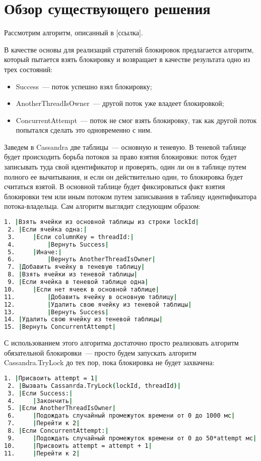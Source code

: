 \section{Обзор существующего решения}

Рассмотрим алгоритм, описанный в [ссылка].

В качестве основы для реализаций стратегий блокировок предлагается алгоритм, который пытается взять блокировку и возвращает в качестве результата одно из трех состояний:

\begin{itemize}
	\item Success~--- поток успешно взял блокировку;
	\item AnotherThreadIsOwner~--- другой поток уже владеет блокировкой;
	\item ConcurrentAttempt~--- поток не смог взять блокировку, так как другой поток попытался сделать это одновременно с ним.
\end{itemize}

Заведем в Cassandra две таблицы~--- основную и теневую. В теневой таблице будет происходить борьба потоков за право взятия блокировки: поток будет записывать туда свой идентификатор и проверять, один ли он в таблице путем полного ее вычитывания, и если он действительно один, то блокировка будет считаться взятой. В основной таблице будет фиксироваться факт взятия блокировки тем или иным потоком путем записывания в таблицу идентификатора потока-владельца.
Сам алгоритм выглядит следующим образом:


\begin{lstlisting}[language=csh,caption={Алгоритм Cassandra.TryLock(lockId, threadId)}]
 1. |Взять ячейки из основной таблицы из строки lockId|
 2. |Если ячейка одна:|
 3. 	|Если columnKey = threadId:|
 4. 		|Вернуть Success|
 5. 	|Иначе:|
 6. 		|Вернуть AnotherThreadIsOwner|
 7. |Добавить ячейку в теневую таблицу|
 8. |Взять ячейки из теневой таблицы|
 9. |Если ячейка в теневой таблице одна|
10. 	|Если нет ячеек в основной таблице|
11. 		|Добавить ячейку в основную таблицу|
12. 		|Удалить свою ячейку из теневой таблицы|
13. 		|Вернуть Success|
14. |Удалить свою ячейку из теневой таблицы|
15. |Вернуть ConcurrentAttempt|
\end{lstlisting}

С использованием этого алгоритма достаточно просто реализовать алгоритм обязательной блокировки~--- просто будем запускать алгоритм Cassandra.TryLock до тех пор, пока блокировка не будет захвачена:

\begin{lstlisting}[language=csh,caption={Алгоритм Cassandra.GetLock(lockId, threadId)}]
 1. |Присвоить attempt = 1|
 2. |Вызвать Cassanrda.TryLock(lockId, threadId)|
 3. |Если Success:|
 4. 	|Закончить|
 5. |Если AnotherThreadIsOwner|
 6. 	|Подождать случайный промежуток времени от 0 до 1000 мс|
 7. 	|Перейти к 2|
 8. |Если ConcurrentAttempt:|
 9. 	|Подождать случайный промежуток времени от 0 до 50*attempt мс|
10. 	|Присвоить attempt = attempt + 1|
11. 	|Перейти к 2|
\end{lstlisting}

